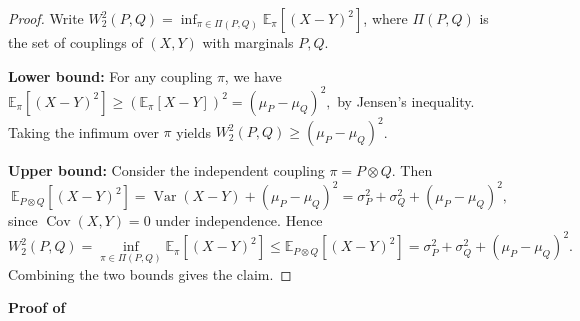 \documentclass[11pt, oneside]{amsart}
\theoremstyle{definition}   %
\newcommand{\E}{\mathbb{E}}
\newcommand{\Var}{\operatorname{Var}}
\newcommand{\Cov}{\operatorname{Cov}}
\begin{document}
\begin{proof}
    Write \( W_2^2(P,Q) = \inf_{\pi\in\Pi(P,Q)} \E_\pi  [(X-Y)^2 ] \), where \(\Pi(P,Q)\) is the set of couplings of \( (X,Y) \) with marginals \( P,Q \).
    
    \textbf{Lower bound:}
    For any coupling $\pi$, we have $\E_\pi [(X-Y)^2] \geq (\mathbb{E}_\pi[X-Y])^2 = (\mu_P-\mu_Q)^2,$
    by Jensen’s inequality.
    Taking the infimum over $\pi$ yields $W_2^2(P,Q)\ge (\mu_P-\mu_Q)^2$.
    
    \textbf{Upper bound:}
    Consider the independent coupling $\pi=P\otimes Q$. Then
    \[
    \E_{P\otimes Q} [(X-Y)^2] = \Var(X-Y) + (\mu_P-\mu_Q)^2 = \sigma_P^2+\sigma_Q^2 + (\mu_P-\mu_Q)^2,
    \]
    since $\Cov(X,Y)=0$ under independence. Hence
    \[
    W_2^2(P,Q) = \inf_{\pi\in\Pi(P,Q)} \mathbb{E}_\pi[(X-Y)^2] \leq \E_{P\otimes Q}[(X-Y)^2] = \sigma_P^2+\sigma_Q^2 + (\mu_P-\mu_Q)^2.
    \]
    Combining the two bounds gives the claim.
\end{proof}
%
\noindent \textbf{Proof of }
\end{document}
